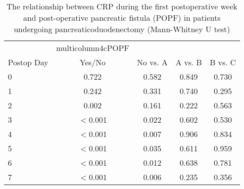 \begin{table}[p]
	\centering
	\caption{The relationship between CRP during the first postoperative week and post-operative pancreatic fistula (POPF) in patients undergoing pancreaticoduodenectomy (Mann-Whitney U test) }
	\label{table:crp_comp_vs_POPF_ISGPS_p_values_only}
	\renewcommand{\arraystretch}{1.2} %
	\begin{tabular}{l | c c c c}
		           & multicolumn{4}{c}{POPF} &  \\
		Postop Day & Yes/No                  & No vs. A & A vs. B & B vs. C \\
		0          & 0.722                   & 0.582    & 0.849   & 0.730   \\
		1          & 0.242                   & 0.331    & 0.740   & 0.295   \\
		2          & 0.002                   & 0.161    & 0.222   & 0.563   \\
		3          & $<$0.001                & 0.022    & 0.602   & 0.530   \\
		4          & $<$0.001                & 0.007    & 0.906   & 0.834   \\
		5          & $<$0.001                & 0.035    & 0.611   & 0.959   \\
		6          & $<$0.001                & 0.012    & 0.638   & 0.781   \\
		7          & $<$0.001                & 0.006    & 0.235   & 0.356
	\end{tabular}
\end{table}
